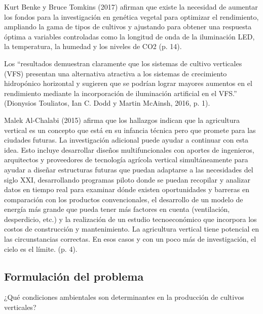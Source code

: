 \documentclass{report}
\begin{document}
Kurt Benke y Bruce Tomkins (2017) afirman que existe la necesidad de aumentar
los fondos para la investigación en genética vegetal para optimizar el
rendimiento, ampliando la gama de tipos de cultivos y ajustando para obtener una
respuesta óptima a variables controladas como la longitud de onda de la
iluminación LED, la temperatura, la humedad y los niveles de CO2 (p. 14).

Los ``resultados demuestran claramente que los sistemas de cultivo
verticales (VFS) presentan una alternativa atractiva a los sistemas de
crecimiento hidropónico horizontal y sugieren que se podrían lograr mayores
aumentos en el rendimiento mediante la incorporación de iluminación artificial
en el VFS.'' (Dionysios Touliatos, Ian C. Dodd y Martin McAinsh, 2016, p. 1).

Malek Al-Chalabi (2015) afirma que los hallazgos indican que la agricultura
vertical es un concepto que está en su infancia técnica pero que promete para
las ciudades futuras. La investigación adicional puede ayudar a continuar con
esta idea. Esto incluye desarrollar diseños multifuncionales con aportes de
ingenieros, arquitectos y proveedores de tecnología agrícola vertical
simultáneamente para ayudar a diseñar estructuras futuras que puedan adaptarse a
las necesidades del siglo XXI, desarrollando programas piloto donde se puedan
recopilar y analizar datos en tiempo real para examinar dónde existen
oportunidades y barreras en comparación con los productos convencionales, el
desarrollo de un modelo de energía más grande que pueda tener más factores en
cuenta (ventilación, desperdicio, etc.) y la realización de un estudio
tecnoeconómico que incorpora los costos de construcción y mantenimiento.
La agricultura vertical tiene potencial en las circunstancias correctas. En esos
casos y con un poco más de investigación, el cielo es el límite. (p. 4).
\subsection{Formulación del problema}
¿Qué condiciones ambientales son determinantes en la producción de
cultivos verticales?
\end{document}
